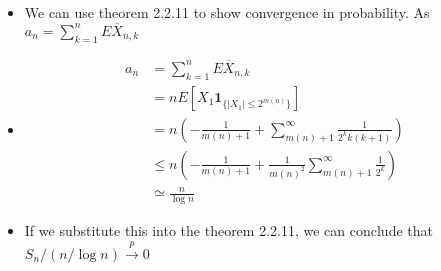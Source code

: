 \documentclass{article}
\newcommand{\bracket}[1]{\left(#1\right)}
\begin{document}
\begin{itemize}
    \item We can use theorem 2.2.11 to show convergence in probability. As $a_n = \sum_{k=1}^{n} E\overline{X}_{n, k}$
    \item[] \begin{itemize}
                \begin{equation}
                    \label{G14}
                    \begin{split}
                        a_n &= \sum_{k=1}^{n} E\overline{X}_{n, k}\\
                        &= n E\left[X_1 \mathbf{1}_{\{|X_1|\leq 2^{m(n)}\}}\right]\\
                        &= n\bracket{-\frac{1}{m(n) + 1 } + \sum_{m(n)+1}^{\infty} \frac{1}{2^k k (k+1)}}\\
                        &\leq n\bracket{-\frac{1}{m(n) + 1 } + \frac{1}{m(n)^2}\sum_{m(n)+1}^{\infty} \frac{1}{2^k}}\\
                        &\simeq \frac{n}{\log{n}}
                    \end{split}
                \end{equation}
            \end{itemize}
    \item If we substitute this into the theorem 2.2.11, we can conclude that $S_n/(n/\log{n}) \xrightarrow{p} 0$
\end{itemize}
\newpage 
\end{document}
